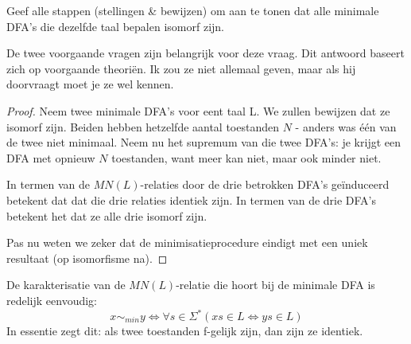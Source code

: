 \begin{question}
  Geef alle stappen (stellingen \& bewijzen) om aan te tonen dat alle minimale DFA's die dezelfde taal bepalen isomorf zijn.
\end{question}

De twee voorgaande vragen zijn belangrijk voor deze vraag. Dit antwoord baseert zich op voorgaande theori\"en. Ik zou ze niet allemaal geven, maar als hij doorvraagt moet je ze wel kennen.

\begin{proof}

  Neem twee minimale DFA's voor eent taal L. We zullen bewijzen dat ze isomorf zijn. Beiden hebben hetzelfde aantal toestanden $N$ - anders was \'e\'en van de twee niet minimaal. Neem nu het supremum van die twee DFA's: je krijgt een DFA met opnieuw $N$ toestanden, want meer kan niet, maar ook minder niet.

  In termen van de $MN(L)$-relaties door de drie betrokken DFA's ge\"induceerd betekent dat dat die drie relaties identiek zijn. In termen van de drie DFA's betekent het dat ze alle drie isomorf zijn.

  Pas nu weten we zeker dat de minimisatieprocedure eindigt met een uniek resultaat (op isomorfisme na).
\end{proof}

De karakterisatie van de $MN(L)$-relatie die hoort bij de minimale DFA is redelijk eenvoudig:
$$x \sim_{min} y \iff \forall s \in \Sigma^*(xs \in L \iff ys \in L)$$
In essentie zegt dit: als twee toestanden f-gelijk zijn, dan zijn ze identiek.
